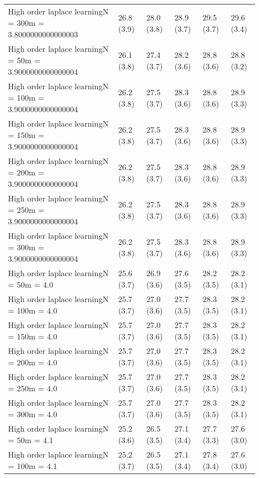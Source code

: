 \documentclass{article}
\begin{document}
\begin{table*}[t!]
\begin{center}
\begin{small}
\begin{sc}
\begin{tabular}{llllll}
High order laplace learningN = 300m = 3.8000000000000003&26.8 (3.9)      &28.0 (3.8)      &28.9 (3.7)      &29.5 (3.7)      &29.6 (3.4)      \\
High order laplace learningN = 50m = 3.9000000000000004&26.1 (3.8)      &27.4 (3.7)      &28.2 (3.6)      &28.8 (3.6)      &28.8 (3.2)      \\
High order laplace learningN = 100m = 3.9000000000000004&26.2 (3.8)      &27.5 (3.7)      &28.3 (3.6)      &28.8 (3.6)      &28.9 (3.3)      \\
High order laplace learningN = 150m = 3.9000000000000004&26.2 (3.8)      &27.5 (3.7)      &28.3 (3.6)      &28.8 (3.6)      &28.9 (3.3)      \\
High order laplace learningN = 200m = 3.9000000000000004&26.2 (3.8)      &27.5 (3.7)      &28.3 (3.6)      &28.8 (3.6)      &28.9 (3.3)      \\
High order laplace learningN = 250m = 3.9000000000000004&26.2 (3.8)      &27.5 (3.7)      &28.3 (3.6)      &28.8 (3.6)      &28.9 (3.3)      \\
High order laplace learningN = 300m = 3.9000000000000004&26.2 (3.8)      &27.5 (3.7)      &28.3 (3.6)      &28.8 (3.6)      &28.9 (3.3)      \\
High order laplace learningN = 50m = 4.0&25.6 (3.7)      &26.9 (3.6)      &27.6 (3.5)      &28.2 (3.5)      &28.2 (3.1)      \\
High order laplace learningN = 100m = 4.0&25.7 (3.7)      &27.0 (3.6)      &27.7 (3.5)      &28.3 (3.5)      &28.2 (3.1)      \\
High order laplace learningN = 150m = 4.0&25.7 (3.7)      &27.0 (3.6)      &27.7 (3.5)      &28.3 (3.5)      &28.2 (3.1)      \\
High order laplace learningN = 200m = 4.0&25.7 (3.7)      &27.0 (3.6)      &27.7 (3.5)      &28.3 (3.5)      &28.2 (3.1)      \\
High order laplace learningN = 250m = 4.0&25.7 (3.7)      &27.0 (3.6)      &27.7 (3.5)      &28.3 (3.5)      &28.2 (3.1)      \\
High order laplace learningN = 300m = 4.0&25.7 (3.7)      &27.0 (3.6)      &27.7 (3.5)      &28.3 (3.5)      &28.2 (3.1)      \\
High order laplace learningN = 50m = 4.1&25.2 (3.6)      &26.5 (3.5)      &27.1 (3.4)      &27.7 (3.3)      &27.6 (3.0)      \\
High order laplace learningN = 100m = 4.1&25.2 (3.7)      &26.5 (3.5)      &27.1 (3.4)      &27.8 (3.4)      &27.6 (3.0)      \\

\end{tabular}
\end{sc}
\end{small}
\end{center}
\end{table*}
\end{document}
